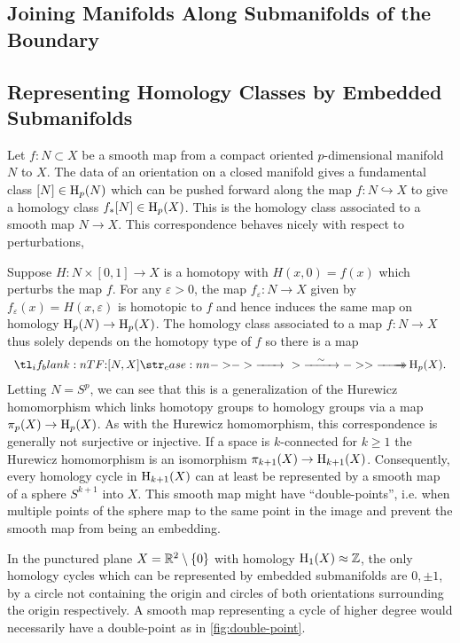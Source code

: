 \subsection{Joining Manifolds Along Submanifolds of the Boundary}

\subsection{Representing Homology Classes by Embedded Submanifolds}

Let $f : N\subset X$ be a smooth map from a compact oriented $p$-dimensional manifold $N$ to $X$. The data of an orientation on a closed manifold gives a fundamental class $[N]\in \operatorname{H}_p(N)$ which can be pushed forward along the map $f : N \hookrightarrow X$ to give a homology class $f_* [N]\in \operatorname{H}_p(X)$. This is the homology class associated to a smooth map $N\to X$.
This correspondence behaves nicely with respect to perturbations, 

Suppose $H : N\times [0,1] \to X$ is a homotopy with $H(x,0)=f(x)$ which perturbs the map $f$. For any $\varepsilon>0$, the map $f_\varepsilon : N \to X$ given by $f_\varepsilon(x)=H(x,\varepsilon)$ is homotopic to $f$ and hence induces the same map on homology $\operatorname{H}_p(N)\to \operatorname{H}_p(X)$. The homology class associated to a map $f : N \to X$ thus solely depends on the homotopy type of $f$ so there is a map
\[
	\lkxfunc{}{[N,X]}{\H_p(X).}
\]
Letting $N=S^p$, we can see that this is a generalization of the Hurewicz homomorphism which links homotopy groups to homology groups via a map $\pi_p(X) \to \operatorname{H}_p(X)$.
As with the Hurewicz homomorphism, this correspondence is generally not surjective or injective. If a space is $k$-connected for $k\geq 1$ the Hurewicz homomorphism is an isomorphism $\pi_{k+1}(X) \to \operatorname{H}_{k+1}(X)$. Consequently, every homology cycle in $\operatorname{H}_{k+1}(X)$ can at least be represented by a smooth map of a sphere $S^{k+1}$ into $X$. This smooth map might have ``double-points'', i.e. when multiple points of the sphere map to the same point in the image and prevent the smooth map from being an embedding.

\begin{example}
	In the punctured plane $X=\mathbb{R}^2\setminus \{0\}$ with homology $\operatorname{H}_1(X)\approx \mathbb{Z}$, the only homology cycles which can be represented by embedded submanifolds are $0,\pm 1$, by a circle not containing the origin and circles of both orientations surrounding the origin respectively. A smooth map representing a cycle of higher degree would necessarily have a double-point as in \cref{fig:double-point}.
\end{example}

